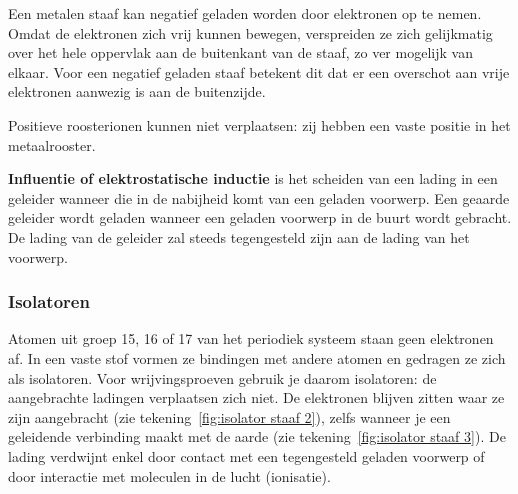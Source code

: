 Een metalen staaf kan negatief geladen worden door elektronen op te nemen. Omdat de elektronen zich vrij kunnen bewegen, verspreiden ze zich gelijkmatig over het hele oppervlak aan de buitenkant van de staaf, zo ver mogelijk van elkaar. Voor een negatief geladen staaf betekent dit dat er een overschot aan vrije elektronen aanwezig is aan de buitenzijde.

\begin{marginfigure}
	\begin{center}
	\end{center}
	\vspace*{-5mm}
	\caption*{\scriptsize Link naar video waar ladingen naderen bij een geleider.}
\end{marginfigure}

\begin{opm}
Positieve roosterionen kunnen niet verplaatsen: zij hebben een vaste positie in het metaalrooster.
\end{opm}
\begin{theorie}
	\textbf{Influentie of elektrostatische inductie} is het scheiden van een lading in een geleider wanneer die in de nabijheid komt van een geladen voorwerp.
	Een geaarde geleider wordt geladen wanneer een geladen voorwerp in de buurt wordt gebracht. De lading van de geleider zal steeds tegengesteld zijn aan de lading van het voorwerp.
\end{theorie}

% 

\subsubsection{Isolatoren}

Atomen uit groep 15, 16 of 17 van het periodiek systeem staan geen elektronen af. In een vaste stof vormen ze bindingen met andere atomen en gedragen ze zich als isolatoren. Voor wrijvingsproeven gebruik je daarom isolatoren: de aangebrachte ladingen verplaatsen zich niet. De elektronen blijven zitten waar ze zijn aangebracht (zie tekening~\ref{fig:isolator staaf 2}), zelfs wanneer je een geleidende verbinding maakt met de aarde (zie tekening~\ref{fig:isolator staaf 3}). De lading verdwijnt enkel door contact met een tegengesteld geladen voorwerp of door interactie met moleculen in de lucht (ionisatie).


